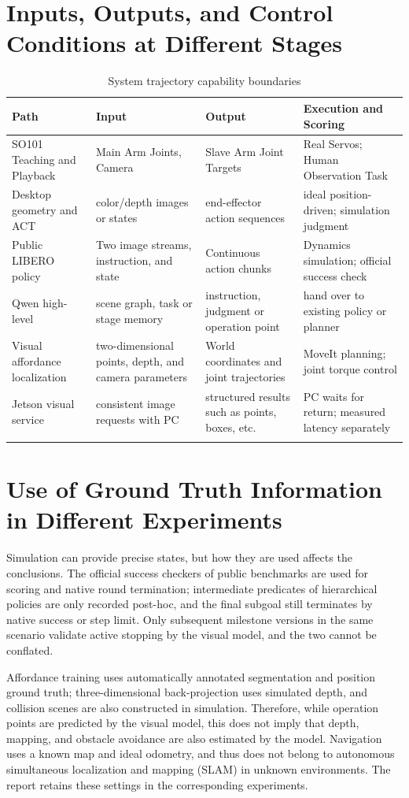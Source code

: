\section{Inputs, Outputs, and Control Conditions at Different Stages}
\begin{longtable}{p{.19\linewidth}p{.23\linewidth}p{.23\linewidth}p{.23\linewidth}}
\toprule Path & Input & Output & Execution and Scoring\\\midrule\endhead
SO101 Teaching and Playback & Main Arm Joints, Camera & Slave Arm Joint Targets & Real Servos; Human Observation Task\\
Desktop geometry and ACT & color/depth images or states & end-effector action sequences & ideal position-driven; simulation judgment\\
Public LIBERO policy & Two image streams, instruction, and state & Continuous action chunks & Dynamics simulation; official success check\\
Qwen high-level & scene graph, task or stage memory & instruction, judgment or operation point & hand over to existing policy or planner\\
Visual affordance localization & two-dimensional points, depth, and camera parameters & World coordinates and joint trajectories & MoveIt planning; joint torque control\\
Jetson visual service & consistent image requests with PC & structured results such as points, boxes, etc. & PC waits for return; measured latency separately\\
\bottomrule\caption{System trajectory capability boundaries}\end{longtable}
\section{Use of Ground Truth Information in Different Experiments}
Simulation can provide precise states, but how they are used affects the conclusions. The official success checkers of public benchmarks are used for scoring and native round termination; intermediate predicates of hierarchical policies are only recorded post-hoc, and the final subgoal still terminates by native success or step limit. Only subsequent milestone versions in the same scenario validate active stopping by the visual model, and the two cannot be conflated.

Affordance training uses automatically annotated segmentation and position ground truth; three-dimensional back-projection uses simulated depth, and collision scenes are also constructed in simulation. Therefore, while operation points are predicted by the visual model, this does not imply that depth, mapping, and obstacle avoidance are also estimated by the model. Navigation uses a known map and ideal odometry, and thus does not belong to autonomous simultaneous localization and mapping (SLAM) in unknown environments. The report retains these settings in the corresponding experiments.
